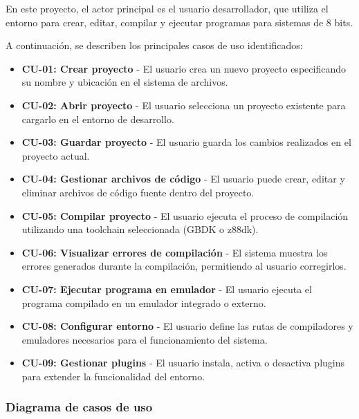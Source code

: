 \documentclass[../../main.tex]{subfiles}
\begin{document}
\par{En este proyecto, el actor principal es el usuario desarrollador, que utiliza el entorno para crear, editar, compilar y ejecutar programas para sistemas de 8 bits.}

\par{A continuación, se describen los principales casos de uso identificados:}

\begin{itemize}
    \item \textbf{CU-01: Crear proyecto} - El usuario crea un nuevo proyecto especificando su nombre y ubicación en el sistema de archivos.
    
    \item \textbf{CU-02: Abrir proyecto} - El usuario selecciona un proyecto existente para cargarlo en el entorno de desarrollo.
        
    \item \textbf{CU-03: Guardar proyecto} - El usuario guarda los cambios realizados en el proyecto actual.
    
    \item \textbf{CU-04: Gestionar archivos de código} - El usuario puede crear, editar y eliminar archivos de código fuente dentro del proyecto.

    \item \textbf{CU-05: Compilar proyecto} - El usuario ejecuta el proceso de compilación utilizando una toolchain seleccionada (GBDK o z88dk).
    
    \item \textbf{CU-06: Visualizar errores de compilación} - El sistema muestra los errores generados durante la compilación, permitiendo al usuario corregirlos.
    
    \item \textbf{CU-07: Ejecutar programa en emulador} - El usuario ejecuta el programa compilado en un emulador integrado o externo.
    
    \item \textbf{CU-08: Configurar entorno} - El usuario define las rutas de compiladores y emuladores necesarios para el funcionamiento del sistema.
    
    \item \textbf{CU-09: Gestionar plugins} - El usuario instala, activa o desactiva plugins para extender la funcionalidad del entorno.
\end{itemize}

\clearpage

\subsubsection{Diagrama de casos de uso}
\end{document}

